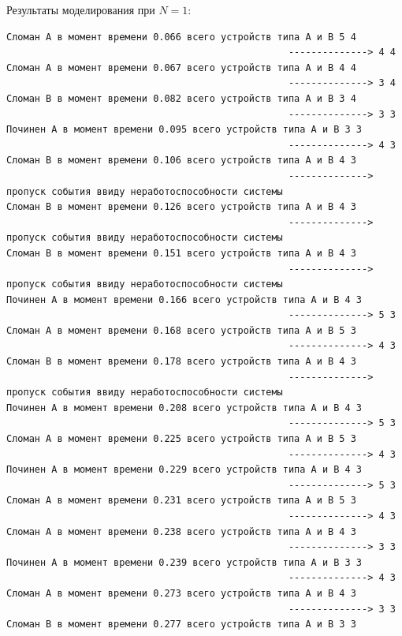 Результаты моделирования при $N=1$:
\scriptsize
\begin{verbatim}
Сломан A в момент времени 0.066 всего устройств типа А и В 5 4
                                                  --------------> 4 4
Сломан A в момент времени 0.067 всего устройств типа А и В 4 4
                                                  --------------> 3 4
Сломан B в момент времени 0.082 всего устройств типа А и В 3 4
                                                  --------------> 3 3
Починен A в момент времени 0.095 всего устройств типа А и В 3 3
                                                  --------------> 4 3
Сломан B в момент времени 0.106 всего устройств типа А и В 4 3
                                                  --------------> пропуск события ввиду неработоспособности системы
Сломан B в момент времени 0.126 всего устройств типа А и В 4 3
                                                  --------------> пропуск события ввиду неработоспособности системы
Сломан B в момент времени 0.151 всего устройств типа А и В 4 3
                                                  --------------> пропуск события ввиду неработоспособности системы
Починен A в момент времени 0.166 всего устройств типа А и В 4 3
                                                  --------------> 5 3
Сломан A в момент времени 0.168 всего устройств типа А и В 5 3
                                                  --------------> 4 3
Сломан B в момент времени 0.178 всего устройств типа А и В 4 3
                                                  --------------> пропуск события ввиду неработоспособности системы
Починен A в момент времени 0.208 всего устройств типа А и В 4 3
                                                  --------------> 5 3
Сломан A в момент времени 0.225 всего устройств типа А и В 5 3
                                                  --------------> 4 3
Починен A в момент времени 0.229 всего устройств типа А и В 4 3
                                                  --------------> 5 3
Сломан A в момент времени 0.231 всего устройств типа А и В 5 3
                                                  --------------> 4 3
Сломан A в момент времени 0.238 всего устройств типа А и В 4 3
                                                  --------------> 3 3
Починен A в момент времени 0.239 всего устройств типа А и В 3 3
                                                  --------------> 4 3
Сломан A в момент времени 0.273 всего устройств типа А и В 4 3
                                                  --------------> 3 3
Сломан B в момент времени 0.277 всего устройств типа А и В 3 3

\end{verbatim}
